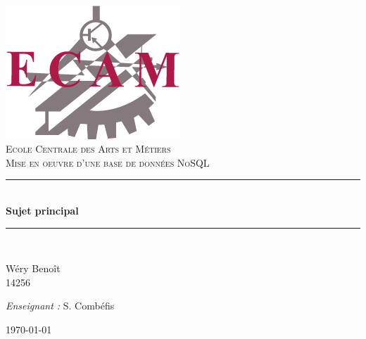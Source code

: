 \setlength{\parindent}{0cm}
\setlength{\parskip}{1ex plus 0.5ex minus 0.2ex}
\newcommand{\hsp}{\hspace{20pt}}
\newcommand{\HRule}{\rule{\linewidth}{0.5mm}}

\begin{titlepage}
  \begin{sffamily}
  \begin{center}

	\hsp\\[2cm]
	\includegraphics[scale=0.3]{images/ecam-logo.png}~\\[1.5cm]
   \textsc{\LARGE Ecole Centrale des Arts et Métiers}\\[2.5cm]

    \textsc{\Large Mise en oeuvre d'une base de données NoSQL}\\[2cm]
%
    \HRule \\[0.4cm]
    { \huge \bfseries Sujet principal\\[0.4cm] }

    \HRule \\[6cm]

    \begin{minipage}{0.4\textwidth}
      \begin{flushleft} \large
        Wéry Benoît\\
        14256\\
      \end{flushleft}
    \end{minipage}
    \begin{minipage}{0.4\textwidth}
      \begin{flushright} \large
        \textit{Enseignant :} S. Combéfis \\
      \end{flushright}
    \end{minipage}

    \vfill
%
    {\today}

  \end{center}
  \end{sffamily}
\end{titlepage}

